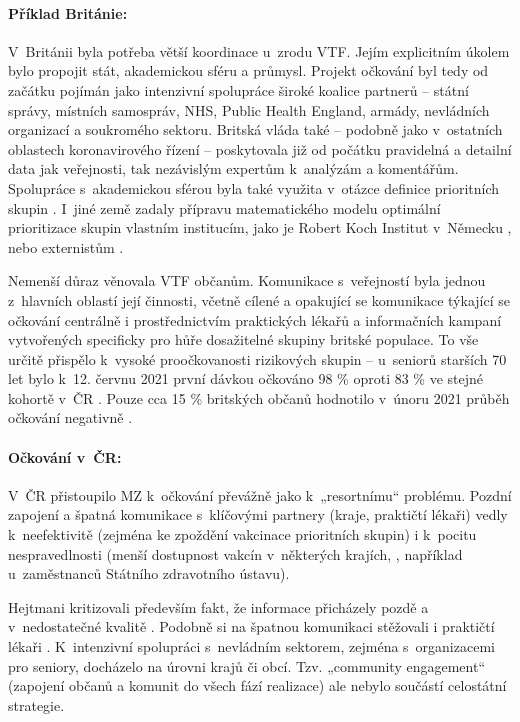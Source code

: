 \paragraph{Příklad Británie:} V~Británii byla potřeba větší koordinace u~zrodu VTF. Jejím explicitním úkolem bylo propojit stát, akademickou sféru a průmysl. Projekt očkování byl tedy od začátku pojímán jako intenzivní spolupráce široké koalice partnerů -- státní správy, místních samospráv, NHS, Public Health England, armády, nevládních organizací a soukromého sektoru. Britská vláda také – podobně jako v~ostatních oblastech koronavirového řízení – poskytovala již od počátku pravidelná a detailní data jak veřejnosti, tak nezávislým expertům k~analýzám a komentářům. Spolupráce s~akademickou sférou byla také využita v~otázce definice prioritních skupin \cite{department_of_health_and_social_care_joint_2020}. I~jiné země zadaly přípravu matematického modelu optimální prioritizace skupin vlastním institucím, jako je Robert Koch Institut v~Německu \cite{rki_rki_2021}, nebo externistům \cite{dooling_phased_2020}.

Nemenší důraz věnovala VTF občanům. Komunikace s~veřejností byla jednou z~hlavních oblastí její činnosti, včetně cílené a opakující se komunikace týkající se očkování centrálně i prostřednictvím praktických lékařů a informačních kampaní vytvořených specificky pro hůře dosažitelné skupiny britské populace. To vše určitě přispělo k~vysoké proočkovanosti rizikových skupin -- u~seniorů starších 70 let bylo k~12. červnu 2021 první dávkou očkováno 98 \%  \cite{nhs_statistics_2021} oproti 83 \% ve stejné kohortě v~ČR \cite{noauthor_microsoft_2021}. Pouze cca 15 \% britských občanů hodnotilo v~únoru 2021 průběh očkování negativně \cite{skinner_strong_2021}.

\paragraph{Očkování v~ČR:} V~ČR přistoupilo MZ k~očkování převážně jako k~„resortnímu“ problému. Pozdní zapojení a špatná komunikace s~klíčovými partnery (kraje, praktičtí lékaři) vedly k~neefektivitě (zejména ke zpoždění vakcinace prioritních skupin) i k~pocitu nespravedlnosti (menší dostupnost vakcín v~některých krajích, , například u~zaměstnanců Státního zdravotního ústavu).

Hejtmani kritizovali především fakt, že informace přicházely pozdě a v~nedostatečné kvalitě \cite{dragoun_hejtmani_2021}. Podobně si na špatnou komunikaci stěžovali i praktičtí lékaři \cite{televize_nevime_2021, prima_delate_2021}. K~intenzivní spolupráci s~nevládním sektorem, zejména s~organizacemi pro seniory, docházelo na úrovni krajů či obcí. Tzv. „community engagement“ (zapojení občanů a komunit do všech fází realizace) ale nebylo součástí celostátní strategie.

